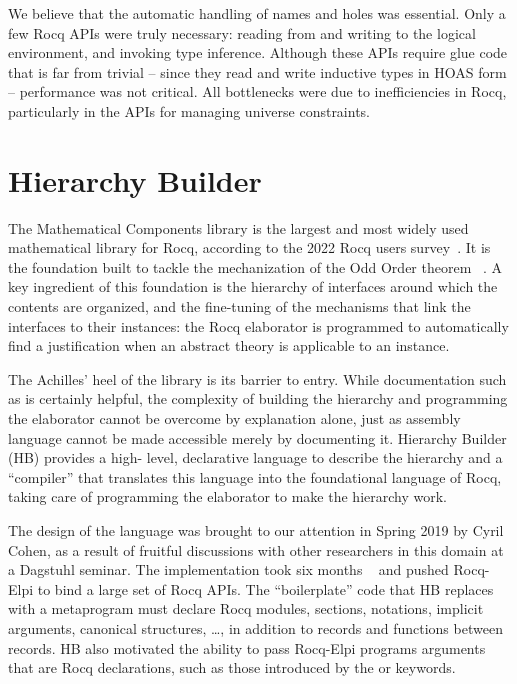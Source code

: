 \documentclass[a4paper, 11pt]{book}
\begin{document}
We believe that the automatic handling of names and holes was essential. Only a
few Rocq APIs were truly necessary: reading from and writing to the logical
environment, and invoking type inference. Although these APIs require glue code
that is far from trivial -- since they read and write inductive types in HOAS
form -- performance was not critical. All bottlenecks were due to inefficiencies
in Rocq, particularly in the APIs for managing universe constraints.


\section{Hierarchy Builder}\label{sec:hb}


The Mathematical Components library is the largest and most widely used
mathematical library for Rocq, according to the 2022 Rocq users
survey~\cite{dealmeidaborges_et_al:LIPIcs.ITP.2023.12}. It is the foundation
built to tackle the mechanization of the Odd Order theorem
~\cite{DBLP:conf/itp/GonthierAABCGRMOBPRSTT13}. A key ingredient of this
foundation is the hierarchy of interfaces around which the contents are
organized, and the fine-tuning of the mechanisms that link the interfaces to
their instances: the Rocq elaborator is programmed to automatically find a
justification when an abstract theory is applicable to an instance.

The Achilles' heel of the library is its barrier to entry. While documentation
such as \cite{assia_mahboubi_2022_7118596} is certainly helpful, the
complexity of building the hierarchy and programming the elaborator cannot be
overcome by explanation alone, just as assembly language cannot be made
accessible merely by documenting it. Hierarchy Builder (HB) provides a high-
level, declarative language to describe the hierarchy and a ``compiler'' that
translates this language into the foundational language of Rocq, taking care of
programming the elaborator to make the hierarchy work.

The design of the language was brought to our attention in Spring 2019 by Cyril
Cohen, as a result of fruitful discussions with other researchers in this
domain at a Dagstuhl seminar. The implementation took six months
~\cite{cohen_et_al:LIPIcs.FSCD.2020.34} and pushed Rocq-Elpi to bind a large
set of Rocq APIs. The ``boilerplate'' code that HB replaces with a metaprogram
must declare Rocq modules, sections, notations, implicit arguments, canonical
structures, \ldots, in addition to records and functions between records. HB
also motivated the ability to pass Rocq-Elpi programs arguments that are Rocq
declarations, such as those introduced by the  or
 keywords.
\end{document}

